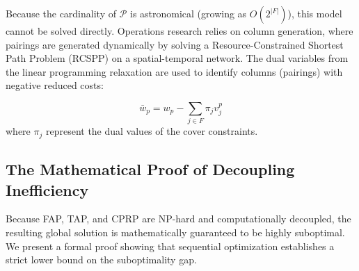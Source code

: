 \documentclass[11pt,a4paper]{book}
\begin{document}
Because the cardinality of $\mathcal{P}$ is astronomical (growing as $O(2^{|F|})$), this model cannot be solved directly. Operations research relies on column generation, where pairings are generated dynamically by solving a Resource-Constrained Shortest Path Problem (RCSPP) on a spatial-temporal network. The dual variables from the linear programming relaxation are used to identify columns (pairings) with negative reduced costs:

\begin{equation}
\bar{w}_p = w_p - \sum_{j \in F} \pi_j v_j^p
\end{equation}
where $\pi_j$ represent the dual values of the cover constraints.

\subsection{The Mathematical Proof of Decoupling Inefficiency}

Because FAP, TAP, and CPRP are NP-hard and computationally decoupled, the resulting global solution is mathematically guaranteed to be highly suboptimal. We present a formal proof showing that sequential optimization establishes a strict lower bound on the suboptimality gap.
\end{document}

